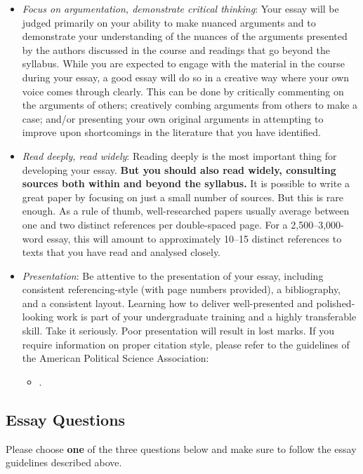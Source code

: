 \documentclass[abstract=on,parskip=full,headings=standardclasses,fontsize=11pt,paper=a4]{scrartcl}
\begin{document}
\begin{itemize}
\begin{itemize}
\item \textit{Focus on argumentation, demonstrate critical thinking}: Your essay will be judged primarily on your ability to make nuanced arguments and to demonstrate your understanding of the nuances of the arguments presented by the authors discussed in the course and readings that go beyond the syllabus. While you are expected to engage with the material in the course during your essay, a good essay will do so in a creative way where your own voice comes through clearly. This can be done by critically commenting on the arguments of others; creatively combing arguments from others to make a case; and/or presenting your own original arguments in attempting to improve upon shortcomings in the literature that you have identified.
\item \textit{Read deeply, read widely}: Reading deeply is the most important thing for developing your essay. \textbf{But you should also read widely, consulting sources both within and beyond the syllabus.} It is possible to write a great paper by focusing on just a small number of sources. But this is rare enough. As a rule of thumb, well-researched papers usually average between one and two distinct references per double-spaced page. For a 2,500--3,000-word essay, this will amount to approximately 10--15 distinct references to texts that you have read and analysed closely. 
\item \textit{Presentation}: Be attentive to the presentation of your essay, including consistent referencing-style (with page numbers provided), a bibliography, and  a consistent layout. Learning how to deliver well-presented and polished-looking work is part of your undergraduate training and a highly transferable skill. Take it seriously. Poor presentation will result in lost marks. If you require information on proper citation style, please refer to the guidelines of the American Political Science Association: 
\begin{itemize}
\item {}.
\end{itemize}
\end{itemize}
\end{itemize}


\subsection*{Essay Questions}

Please choose \textbf{one} of the three questions below and make sure to follow the essay guidelines described above. 
\end{document}

